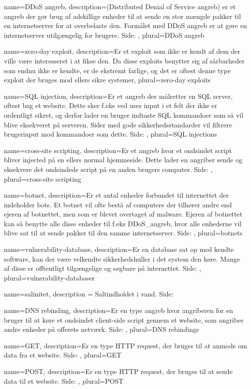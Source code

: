 \makeglossaries

{
    name={DDoS angreb},
    description={(Distributed Denial of Service angreb) er et angreb der gør brug af adskillige enheder til at sende en stor mængde pakker til en internetserver for at overbelaste den. Formålet med DDoS angreb er at gøre en internetserver utilgængelig for brugere.  Side: },
    plural={DDoS angreb}
}

{
    name={zero-day exploit},
    description={Er et exploit som ikke er kendt af dem der ville være interesseret i at fikse den. Da disse exploits benytter sig af sårbarheder som endnu ikke er kendte, er de ekstremt farlige, og det er oftest denne type exploit der bruges mod ellers sikre systemer},
    plural={zero-day exploits}
}

{
    name={SQL injection},
    description={Er et angreb der målretter en SQL server, oftest bag et website. Dette sker f.eks ved user input i et felt der ikke er ordentligt sikret, og derfor lader en bruger indtaste SQL kommandoer som så vil blive eksekveret på serveren. Sider med gode sikkerhedsstandarder vil filtrere brugerinput mod kommandoer som dette.  Side: },
    plural={SQL injections}
}

{
    name={cross-site scripting},
    description={Er et angreb hvor et ondsindet script bliver injected på en ellers normal hjemmeside. Dette lader en angriber sende og eksekvere det ondsindede script på en anden brugers computer. Side: },
    plural={cross-site scripting}
}

{
    name={botnet},
    description={Er et antal enheder forbundet til internettet der indeholder bots. Et botnet vil ofte bestå af computere der tilhører andre end ejeren af botnettet, men som er blevet overtaget af malware. Ejeren af botnettet kan så benytte alle disse enheder til f.eks \Gls{DDoS_angreb}, hvor alle enhederne vil blive sat til at sende pakker til den samme internetserver. Side: }, 
    plural={botnets}
}

{
    name={vulnerability-database},
    description={Er en database sat op med kendte software, kan der være velkendte sikkerhedshuller i det system den køre. Mange af disse er offtentligt tilgængelige og søgbare på internettet.  Side: }, 
    plural={vulnerability-databaser}
}

{
    name={salinitet},
    description = {Saltindholdet i vand. Side: }
}

{
    name={DNS rebinding},
    description={Er en type angreb hvor angriberen for en bruger til at køre et ondsindet client-side script gennem et website, som angriber andre enheder på offerets netværk.  Side: }, 
    plural={DNS rebindings}
}

{
    name={GET},
    description={Er en type HTTP request, der bruges til at anmode om data fra et website.  Side: }, 
    plural={GET}
}

{
    name={POST},
    description={Er en type HTTP request, der bruges til at sende data til et website.  Side: }, 
    plural={POST}
}